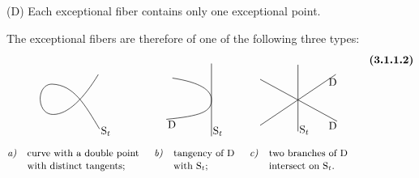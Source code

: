 \documentclass[11pt,leqno]{article}
\begin{document}
(D) Each exceptional fiber contains only one exceptional point.

The exceptional fibers are therefore of one of the following three types:
\[
\begin{tikzcd}[
  ampersand replacement=\&,
  column sep=1.4em,
  row sep=1em,
  baseline=(current bounding box.north),
  cells={nodes={inner sep=0pt}}
]
{
\begin{tikzpicture}[x=0.8cm,y=0.8cm,baseline=0pt]
\draw[line width=0.5pt]
 (1.05,1.05)
 .. controls (0.45,0.05) and (-0.20,-0.60) .. (-0.80,-0.60)
 .. controls (-1.50,-0.60) and (-1.50,0.65) .. (-0.85,0.65)
 .. controls (0.05,0.62) and (0.50,-0.20) .. (1.10,-1.20);
\node[anchor=west] at (1.15,-1.30) {\(\mathrm S_t\)};
\end{tikzpicture}
}
\&
{
\begin{tikzpicture}[x=0.8cm,y=0.8cm,baseline=0pt]
\draw[line width=0.5pt] (0.60,-1.50)--(0.60,1.50);
\draw[line width=0.5pt]
 (-1.00,0.90)
 .. controls (0.15,0.72) and (0.60,0.40) .. (0.60,0)
 .. controls (0.60,-0.50) and (0.15,-0.66) .. (-1.25,-0.80);
\node[anchor=north west] at (-1.20,-0.85) {\(\mathrm D\)};
\node[anchor=west] at (0.65,-1.30) {\(\mathrm S_t\)};
\end{tikzpicture}
}
\&
{
\begin{tikzpicture}[x=0.8cm,y=0.8cm,baseline=0pt]
\draw[line width=0.5pt] (0,-1.30)--(0,1.45);
\draw[line width=0.5pt] (-1.55,-1.05)--(1.55,1.05);
\draw[line width=0.5pt] (-1.55,0.85)--(1.60,-0.88);
\node[anchor=north east] at (1.60,0.90) {\(\mathrm D\)};
\node[anchor=north east] at (1.60,-0.90) {\(\mathrm D\)};
\node[anchor=west] at (0.05,-1.25) {\(\mathrm S_t\)};
\end{tikzpicture}
}
\\
{
\begin{array}{@{}ll@{}}
\text{\small\textit{a)}} & \text{\small curve with a double point}\\
 & \text{\small with distinct tangents;}
\end{array}
}
\&
{
\begin{array}{@{}ll@{}}
\text{\small\textit{b)}} & \text{\small tangency of \(\mathrm D\)}\\
 & \text{\small with \(\mathrm S_t\);}
\end{array}
}
\&
{
\begin{array}{@{}ll@{}}
\text{\small\textit{c)}} & \text{\small two branches of \(\mathrm D\)}\\
 & \text{\small intersect on \(\mathrm S_t\).}
\end{array}
}
\end{tikzcd}
\tag*{\textbf{(3.1.1.2)}}
\]
\end{document}
